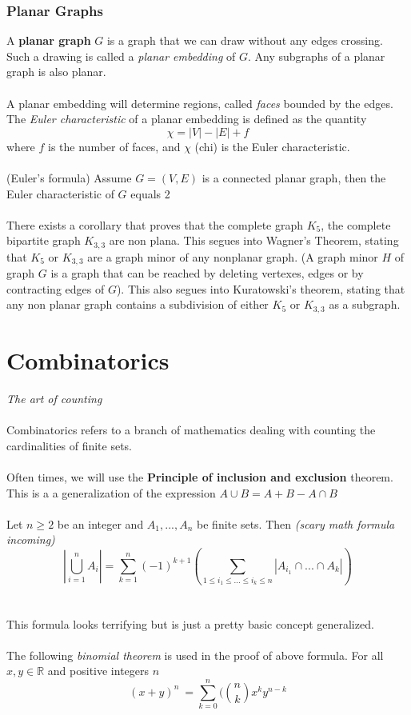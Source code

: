 \documentclass{article}
\begin{document}
\subsubsection{Planar Graphs}
A \textbf{planar graph} $G$ is a graph that we can draw without any edges crossing. Such a drawing is called a \textit{planar embedding} of $G$. Any subgraphs of a planar graph is also planar.
\\\\
A planar embedding will determine regions, called \textit{faces} bounded by the edges. The \textit{Euler characteristic} of a planar embedding is defined as the quantity
\[\chi = |V| - |E| + f\]
where $f$ is the number of faces, and $\chi$ (chi) is the Euler characteristic.
\\\\
(Euler's formula) Assume $G=(V,E)$ is a connected planar graph, then the Euler characteristic of $G$ equals 2
\\\\
There exists a corollary that proves that the complete graph $K_5$, the complete bipartite graph $K_{3,3}$ are non plana. This segues into Wagner's Theorem, stating that $K_5$ or $K_{3,3}$ are a graph minor of any nonplanar graph. (A graph minor $H$ of graph $G$ is a graph that can be reached by deleting vertexes, edges or by contracting edges of $G$). This also segues into Kuratowski's theorem, stating that any non planar graph contains a subdivision of either $K_5$ or $K_{3,3}$ as a subgraph.
\section{Combinatorics}
\textit{The art of counting}
\\\\
Combinatorics refers to a branch of mathematics dealing with counting the cardinalities of finite sets.
\\\\
Often times, we will use the \textbf{Principle of inclusion and exclusion} theorem. This is a a generalization of the expression $A\cup B = A+B-A\cap B$
\\\\
Let $n\ge2$ be an integer and $A_1,...,A_n$ be finite sets. Then \textit{(scary math formula incoming)}
\[|\bigcup_{i=1}^nA_i| = \sum^n_{k=1}(-1)^{k+1}(\sum_{1\le i_1 \le ... \le i_k \le n}|A_{i_1} \cap...\cap A_k|)\]
\\\\
This formula looks terrifying but is just a pretty basic concept generalized.
\\\\
The following \textit{binomial theorem} is used in the proof of above formula. For all $x,y\in\mathds{R}$ and positive integers $n$
\[(x+y)^n\ = \sum ^n_{k=0} ({n\choose k}x^ky^{n-k}\]
\end{document}
